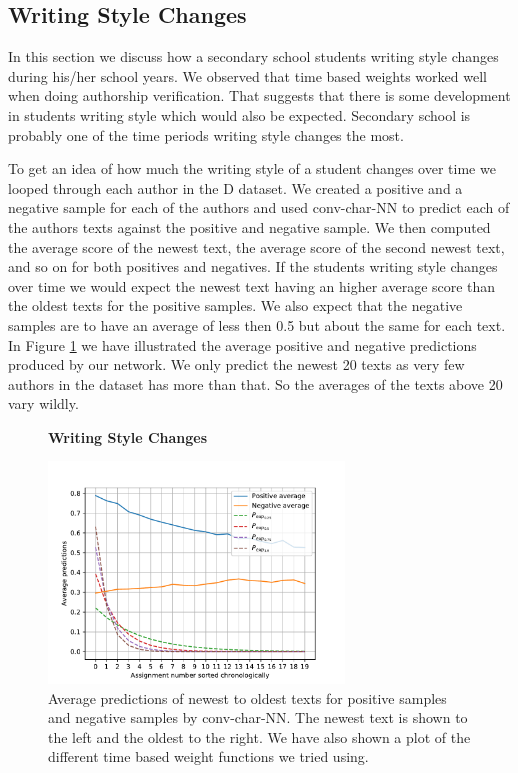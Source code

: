 \subsection{Writing Style Changes}
\label{subsec:writing_style_changes}

In this section we discuss how a secondary school students writing style changes
during his/her school years. We observed that time based weights worked well
when doing authorship verification. That suggests that there is some development
in students writing style which would also be expected. Secondary school is
probably one of the time periods writing style changes the most.

To get an idea of how much the writing style of a student changes over time we
looped through each author in the \gls{D} dataset. We created a positive and a
negative sample for each of the authors and used \gls{conv-char-NN} to predict
each of the authors texts against the positive and negative sample. We then
computed the average score of the newest text, the average score of the second
newest text, and so on for both positives and negatives. If the students writing
style changes over time we would expect the newest text having an higher average
score than the oldest texts for the positive samples. We also expect that the
negative samples are to have an average of less then 0.5 but about the same
for each text. In Figure \ref{fig:writing_style_changes} we have illustrated
the average positive and negative predictions produced by our network. We only
predict the newest 20 texts as very few authors in the dataset has more than
that. So the averages of the texts above 20 vary wildly.

\begin{figure}
    \centering
    \textbf{Writing Style Changes}\par\medskip
    \includegraphics[width=0.7\textwidth]{./pictures/discussion/writing_style_change}
    \caption{Average predictions of newest to oldest texts for positive samples
        and negative samples by \gls{conv-char-NN}. The newest text is shown to
        the left and the oldest to the right. We have also shown a plot of the
        different time based weight functions we tried using.}
    \label{fig:writing_style_changes}
\end{figure}

